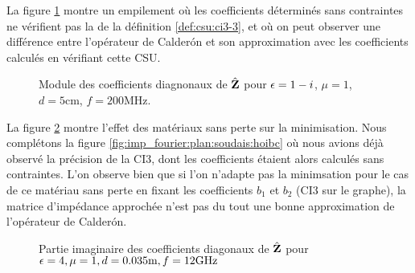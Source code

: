   La figure \ref{fig:imp_fourier:plan:stupfel:hoibc_vs_csu} montre un empilement où les coefficients déterminés sans contraintes ne vérifient pas la  de la définition \ref{def:csu:ci3-3}, et où on peut observer une différence entre l'opérateur de Calderón et son approximation avec les coefficients calculés en vérifiant cette CSU.

  \begin{figure}[!hbt]
    \centering
    
    \caption[Module de la matrice d'impédance pour le matériau M1, perte de précision à cause de la CSU]{ Module des coefficients diagnonaux de \(\hat{\mathbf{Z}}\) pour \(\epsilon = 1-i\), \(\mu = 1\), \(d=5\)cm, \(f=200\)MHz.}
    \label{fig:imp_fourier:plan:stupfel:hoibc_vs_csu}
  \end{figure}

  \begin{table}[!hbt]
    \centering

    \caption{Coefficients associés à la figure \ref{fig:imp_fourier:plan:soudais:hoibc_csu}}
    \label{tab:imp_fourier:plan:soudais:hoibc_csu}
  \end{table}

  \FloatBarrier

  La figure \ref{fig:imp_fourier:plan:soudais:hoibc_csu} montre l'effet des matériaux sans perte sur la minimisation.
  Nous complétons la figure \ref{fig:imp_fourier:plan:soudais:hoibc} où nous avions déjà observé la précision de la CI3, dont les coefficients étaient alors calculés sans contraintes.
  L'on observe bien que si l'on n'adapte pas la minimsation pour le cas de ce matériau sans perte en fixant les coefficients \(b_1\) et \(b_2\) (CI3 sur le graphe), la matrice d'impédance approchée n'est pas du tout une bonne approximation de l'opérateur de Calderón.

  \begin{figure}[!hbt]
    \centering
    
    \caption[Partie imaginaire de l'opérateur de Calderón, comparé avec les approximations CI0, CI3, CI3 avec CSU, CI3 avec CSU adaptée pour une couche plane de matériau sans pertes de P.~Soudais]{Partie imaginaire des coefficients diagonaux de \(\hat{\mathbf{Z}}\) pour \(\epsilon = 4, \mu = 1, d=0.035\text{m}, f=12\text{GHz}\)}
    \label{fig:imp_fourier:plan:soudais:hoibc_csu}
  \end{figure}

